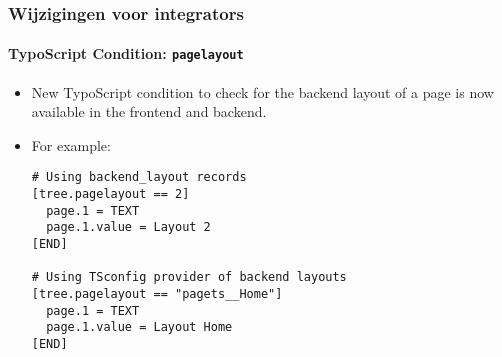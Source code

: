 %

\begin{frame}[fragile]
	\frametitle{Wijzigingen voor integrators}
	\framesubtitle{TypoScript Condition: \texttt{pagelayout}}

	\lstset{basicstyle=\tiny\ttfamily}

	\begin{itemize}
		\item New TypoScript condition to check for the backend layout of a page
			is now available in the frontend and backend.
		\item For example:
\begin{lstlisting}
# Using backend_layout records
[tree.pagelayout == 2]
  page.1 = TEXT
  page.1.value = Layout 2
[END]

# Using TSconfig provider of backend layouts
[tree.pagelayout == "pagets__Home"]
  page.1 = TEXT
  page.1.value = Layout Home
[END]
\end{lstlisting}

	\end{itemize}
\end{frame}

